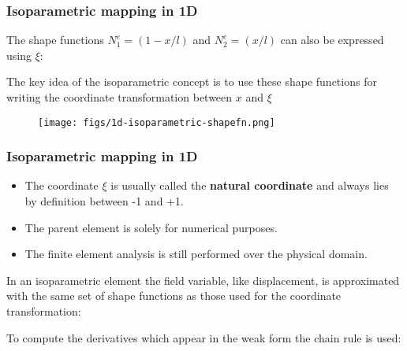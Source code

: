 \documentclass[notes]{beamer}
\begin{document}
\begin{frame}
\frametitle{Isoparametric mapping in 1D}
The shape functions $N_1^e = (1 - x/l)$ and $N_2^e = (x/l)$ can also be expressed using $\xi$:

The key idea of the isoparametric concept is to use these shape functions for writing the
coordinate transformation between $x$ and $\xi$ 

\begin{figure}[ht]
	\centering
	\texttt{[image: figs/1d-isoparametric-shapefn.png]}
\end{figure}
\end{frame}


\begin{frame}
\frametitle{Isoparametric mapping in 1D}

\begin{itemize}
	\item The coordinate $\xi$ is usually called the \textbf{natural coordinate} and always lies by definition between -1 and +1.
	
	\item The parent element is solely for numerical purposes. 
	
	\item The finite element analysis is still performed over the physical domain.
\end{itemize}


In an isoparametric element the field variable, like displacement, is approximated with the
same set of shape functions as those used for the coordinate transformation:


To compute the derivatives which appear in the weak form the chain rule is used:

\end{frame}
\end{document}
